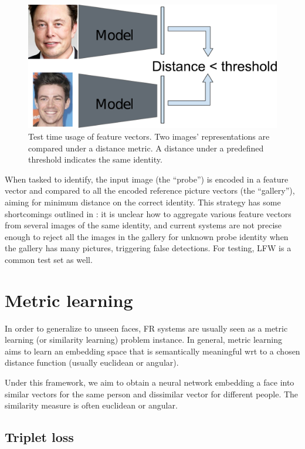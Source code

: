 \begin{figure}
    \centering
    \includegraphics[width=\columnwidth]{50-files/facerec2.pdf}
    \caption{Test time usage of feature vectors. Two images’ representations are compared under a distance metric. A distance under a predefined threshold indicates the same identity.}
    \label{fig:facerec2}
\end{figure}

When tasked to identify, the input image (the “probe”) is encoded in a feature vector and compared to all the encoded reference picture vectors (the “gallery”), aiming for minimum distance on the correct identity. This strategy has some shortcomings outlined in \cite{ijb-a}: it is unclear how to aggregate various feature vectors from several images of the same identity, and current systems are not precise enough to reject all the images in the gallery for unknown probe identity when the gallery has many pictures, triggering false detections. For testing, LFW \cite{lfw} is a common test set as well.

\section{Metric learning}

In order to generalize to unseen faces, FR systems are usually seen as a metric learning (or similarity learning) problem instance. In general, metric learning aims to learn an embedding space that is semantically meaningful wrt to a chosen distance function (usually euclidean or angular).

Under this framework, we aim to obtain a neural network embedding a face into similar vectors for the same person and dissimilar vector for different people. The similarity measure is often euclidean or angular.

\subsection{Triplet loss}

